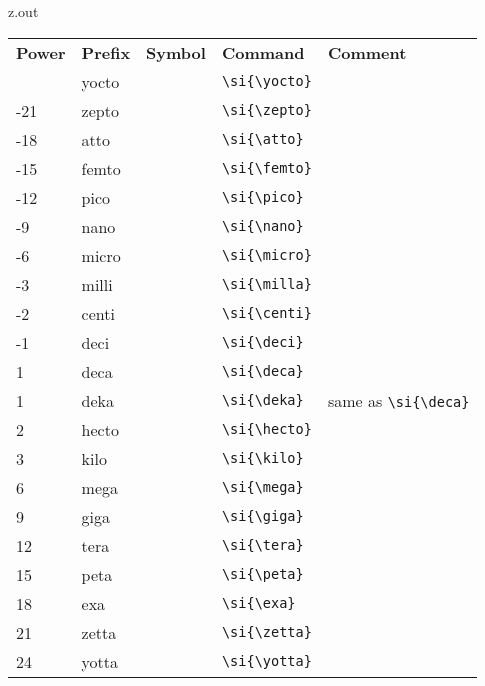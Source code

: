 \MyIO

\begin{VerbatimOut}{z.out}

\begin{tabular}{@{}mllll@{}}
  \multicolumn{1}{l}{\bfseries Power}&
    \bfseries Prefix&
    \bfseries Symbol&
    \bfseries Command&
    \bfseries Comment\\
  \tabularspace
  -24& yocto& \unit{\yocto\nounit}& \verb+\si{\yocto}+\\
  -21& zepto& \unit{\zepto\nounit}& \verb+\si{\zepto}+\\
  -18& atto&  \unit{\atto\nounit}&  \verb+\si{\atto}+\\
  -15& femto& \unit{\femto\nounit}& \verb+\si{\femto}+\\
  -12& pico&  \unit{\pico\nounit}&  \verb+\si{\pico}+\\
   -9& nano&  \unit{\nano\nounit}&  \verb+\si{\nano}+\\
   -6& micro& \unit{\micro\nounit}& \verb+\si{\micro}+\\
   -3& milli& \unit{\milli\nounit}& \verb+\si{\milla}+\\
   -2& centi& \unit{\centi\nounit}& \verb+\si{\centi}+\\
   -1& deci&  \unit{\deci\nounit}&  \verb+\si{\deci}+\\
    1& deca&  \unit{\deca\nounit}&  \verb+\si{\deca}+\\
    1& deka&  \unit{\deka\nounit}&  \verb+\si{\deka}+& same as \verb+\si{\deca}+\\
    2& hecto& \unit{\hecto\nounit}& \verb+\si{\hecto}+\\
    3& kilo&  \unit{\kilo\nounit}&  \verb+\si{\kilo}+\\
    6& mega&  \unit{\mega\nounit}&  \verb+\si{\mega}+\\
    9& giga&  \unit{\giga\nounit}&  \verb+\si{\giga}+\\
   12& tera&  \unit{\tera\nounit}&  \verb+\si{\tera}+\\
   15& peta&  \unit{\peta\nounit}&  \verb+\si{\peta}+\\
   18& exa&   \unit{\exa\nounit}&   \verb+\si{\exa}+\\
   21& zetta& \unit{\zetta\nounit}& \verb+\si{\zetta}+\\
   24& yotta& \unit{\yotta\nounit}& \verb+\si{\yotta}+\\
\end{tabular}
\end{VerbatimOut}

